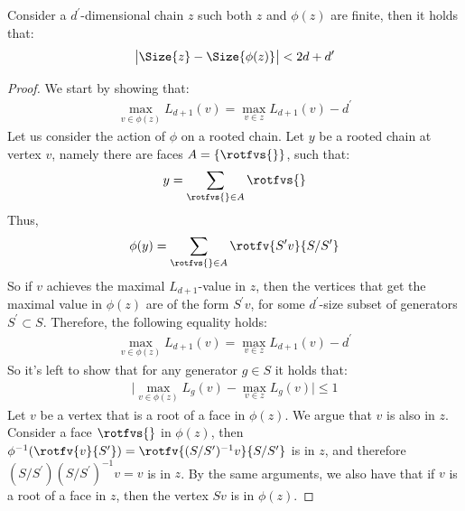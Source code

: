 \begin{claim}
  \label{claim:diamexp}
  Consider a $d^{\prime}$-dimensional chain $z$ such both $z$ and $\phi(z)$ are finite, then it holds that: 
      \begin{equation*}
        \begin{split}
          \bigl| \Size{ z  } - \Size{ \phi(z)  } \bigr| < 2d + d^{\prime}
        \end{split}
      \end{equation*}
\end{claim}
\begin{proof}
  We start by showing that: 
\begin{equation*}
  \begin{split}
    \max_{v \in \phi(z)}L_{d+1}(v) = \max_{v \in z }L_{d+1}(v) - d^{\prime}
  \end{split}
\end{equation*}
Let us consider the action of $\phi$ on a rooted chain. Let $y$ be a rooted chain at vertex $v$, namely there are faces $A = \{ \rotfvs{} \}$, such that:
\begin{equation*}
  \begin{split}
    y = \sum_{ \rotfvs{} \in A}\rotfvs{}
  \end{split}
\end{equation*}
Thus, 
\begin{equation*}
  \begin{split}
    \phi(y) = \sum_{ \rotfvs{} \in A}\rotfv{S^{\prime}v}{S/S^{\prime}}
  \end{split}
\end{equation*}
So if $v$ achieves the maximal $L_{d+1}$-value in $z$, then the vertices that get the maximal value in $\phi(z)$ are of the form $S^{\prime}v$, for some $d^{\prime}$-size subset of generators $S^{\prime} \subset S$. Therefore, the following equality holds:
\begin{equation*}
  \begin{split}
    \max_{v \in \phi(z)}L_{d+1}(v) = \max_{v \in z }L_{d+1}(v) - d^{\prime}
  \end{split}
\end{equation*}
So it's left to show that for any generator $g \in S$ it holds that: 
\begin{equation*}
  \begin{split}
     \bigl| \max_{v \in \phi(z)}L_{g}(v) -  \max_{v \in z }L_{g}(v) \bigr| \le 1
  \end{split}
\end{equation*}
Let $v$ be a vertex that is a root of a face in $\phi(z)$. We argue that $v$ is also in $z$. Consider a face $\rotfvs{}$ in $\phi(z)$, then $\phi^{-1}(\rotfv{v}{S^{\prime}}) = \rotfv{(S/S^{\prime})^{-1} v}{S/S^{\prime}}$ is in $z$, and therefore $(S/S^{\prime})(S/S^{\prime})^{-1} v = v$ is in $z$. By the same arguments, we also have that if $v$ is a root of a face in $z$, then the vertex $S v$ is in $\phi(z)$.



\end{proof}
